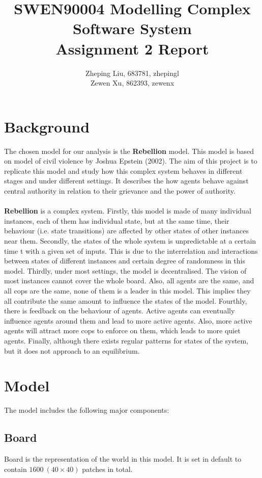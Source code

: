 \documentclass[11pt]{article}
\title{SWEN90004 Modelling Complex Software System\\
        \textbf{Assignment 2 Report}}
\author{Zheping Liu, 683781, zhepingl\\
        Zewen Xu, 862393, zewenx}
\date{}
\begin{document}
    \maketitle
    \section{Background}
        The chosen model for our analysis is the \textbf{Rebellion} model. 
        This model is based on model of civil violence by Joshua Epstein (2002).
        The aim of this project is to replicate this model and study how this 
        complex system behaves in different stages and under different settings.
        It describes the how agents behave against central authority in relation
        to their grievance and the power of authority.
        \paragraph{}
        \textbf{Rebellion} is a complex system. Firstly, this model is made
        of many individual instances, each of them has individual state, but at
        the same time, their behaviour (i.e. state transitions) are affected by
        other states of other instances near them. Secondly, the states of the 
        whole system is unpredictable at a certain time t with a given set of inputs.
        This is due to the interrelation and interactions between states of 
        different instances and certain degree of randomness in this model. 
        Thirdly, under most settings, the model is decentralised. The vision of
        most instances cannot cover the whole board. Also, all agents are the same, 
        and all cops are the same, none of them is a leader in this model. This
        implies they all contribute the same amount to influence the states of the
        model. Fourthly, there is feedback on the behaviour of agents. Active agents
        can eventually influence agents around them and lead to more active agents.
        Also, more active agents will attract more cops to enforce on them, which
        leads to more quiet agents. Finally, although there exists regular patterns 
        for states of the system, but it does not approach to an equilibrium. 
        
    \section{Model}
        The model includes the following major components:
        \subsection{Board}
        Board is the representation of the world in this model. It is set in default
        to contain $1600\:(40 \times 40)$ patches in total.
\end{document}
